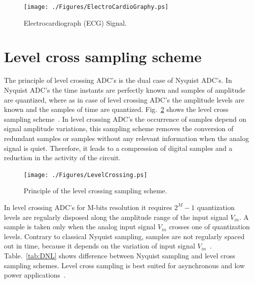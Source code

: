 \begin{figure}[ht]
	\begin{center}
		\texttt{[image: ./Figures/ElectroCardioGraphy.ps]}
		\caption{Electrocardiograph (ECG) Signal.}
		\label{fig:ECG}
	\end{center}
\end{figure}


\section{Level cross sampling scheme}

\par
\hspace{1.2cm} The principle of level crossing ADC's is the dual case of Nyquist ADC's. In Nyquist ADC's the time instants are perfectly known and samples of amplitude are quantized, where as in case of level crossing ADC's the amplitude levels are known and the samples of time are quantized. Fig.~\ref{fig:LCS} shows the level cross sampling scheme~\cite{1595684}. In level crossing ADC's the occurrence of samples depend on signal amplitude variations, this sampling scheme removes the conversion of redundant samples or samples without any relevant information when the analog signal is quiet. Therefore, it leads to a compression of digital samples and a reduction in the activity of the circuit.

\begin{figure}[ht]
	\begin{center}
		\texttt{[image: ./Figures/LevelCrossing.ps]}
		\caption{Principle of the level crossing sampling scheme. }
		\label{fig:LCS}
	\end{center}
\end{figure}

\par
\hspace{0.6cm} In level crossing ADC's for M-bits resolution it requires $2^M-1$ quantization levels are regularly disposed along the amplitude range of the input signal $V_{in}$. A sample is taken only when the analog input signal $V_{in}$ crosses one of quantization levels. Contrary to classical Nyquist sampling, samples are not regularly spaced out in time, because it depends on the variation of input signal $V_{in}$~\cite{allier2005asynchronous}. Table.~\ref{tab:DNL} shows difference between Nyquist sampling and level cross sampling schemes. Level cross sampling is best suited for asynchronous and low power applications~\cite{allier2003new}.

